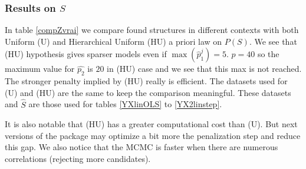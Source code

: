 \documentclass[11pt,a4paper]{article}
\begin{document}
		\subsubsection{Results on $S$}	\label{compZ}
In table \ref{compZvrai} we compare found structures in different contexts with both Uniform (U) and Hierarchical Uniform (HU) a priori law on $P(S)$. 
We see that (HU) hypothesis gives sparser models even if $\max (\hat{p}_1^j)=5$. $p=40$ so the maximum value for $\hat{p_2}$ is $20$ in (HU) case and we see that this max is not reached. The stronger penalty implied by (HU) really is efficient. The datasets used for (U) and (HU) are the same to keep the comparison  meaningful. These datasets and $\hat{S}$ are those used for tables 
 \ref{YXlinOLS} to \ref{YX2linstep}.
 
 It is also notable that (HU) has a greater computational cost than (U). But next versions of the package may optimize a bit more the penalization step and reduce this gap.
	We also notice that the MCMC is faster when there are numerous correlations (rejecting more candidates). 
\end{document}
